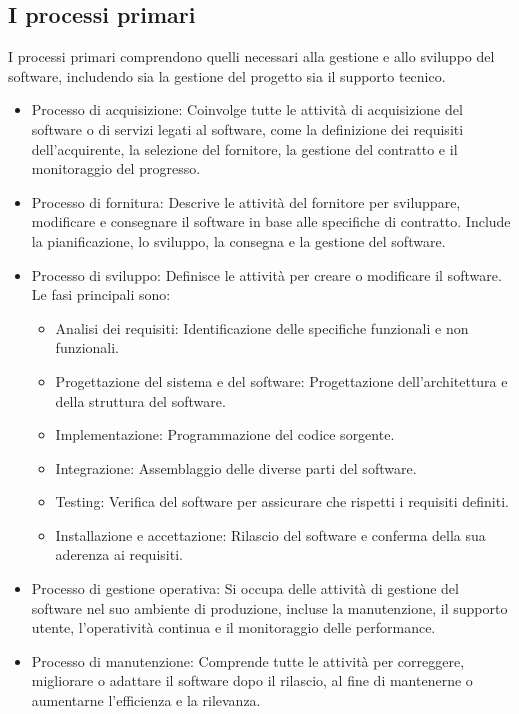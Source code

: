 \subsection{I processi primari}
I processi primari comprendono quelli necessari alla gestione e allo sviluppo del software, includendo sia la gestione del progetto sia il supporto tecnico.
\begin{itemize}
    \item Processo di acquisizione: Coinvolge tutte le attività di acquisizione del software o di servizi legati al software, come la definizione dei requisiti dell'acquirente, la selezione del fornitore, la gestione del contratto e il monitoraggio del progresso.
    \item Processo di fornitura: Descrive le attività del fornitore per sviluppare, modificare e consegnare il software in base alle specifiche di contratto. Include la pianificazione, lo sviluppo, la consegna e la gestione del software.
    \item Processo di sviluppo: Definisce le attività per creare o modificare il software. Le fasi principali sono:
    \begin{itemize}
        \item Analisi dei requisiti: Identificazione delle specifiche funzionali e non funzionali.
        \item Progettazione del sistema e del software: Progettazione dell'architettura e della struttura del software.
        \item Implementazione: Programmazione del codice sorgente.
        \item Integrazione: Assemblaggio delle diverse parti del software.
        \item Testing: Verifica del software per assicurare che rispetti i requisiti definiti.
        \item Installazione e accettazione: Rilascio del software e conferma della sua aderenza ai requisiti.
    \end{itemize}
    \item Processo di gestione operativa: Si occupa delle attività di gestione del software nel suo ambiente di produzione, incluse la manutenzione, il supporto utente, l'operatività continua e il monitoraggio delle performance.
    \item Processo di manutenzione: Comprende tutte le attività per correggere, migliorare o adattare il software dopo il rilascio, al fine di mantenerne o aumentarne l'efficienza e la rilevanza.
\end{itemize}

